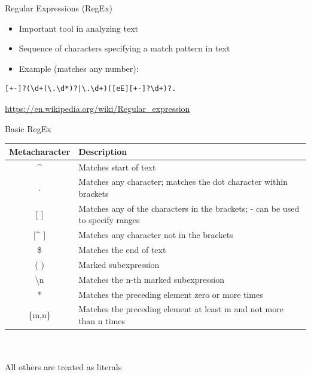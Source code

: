 \documentclass[ignorenonframetext,xcolor=x11names]{beamer}
\begin{document}
\begin{frame}[label=advanced,fragile]{Regular Expressions (RegEx)}
\begin{itemize}
	\item Important tool in analyzing text
	\item Sequence of characters specifying a match pattern in text
	\item Example (matches any number):
\end{itemize}
\begin{verbatim}
[+-]?(\d+(\.\d*)?|\.\d+)([eE][+-]?\d+)?.
\end{verbatim}
\tiny{\url{https://en.wikipedia.org/wiki/Regular\_expression}}
\end{frame}

\begin{frame}[label=advanced]{Basic RegEx}
\footnotesize
\renewcommand{\arraystretch}{1.5}
\begin{tabularx}{\textwidth}{c|X} \hline
{\bf Metacharacter} & {\bf Description} \\ \hline \hline
\^{ } & Matches start of text \\ \hline
. & Matches any character; matches the dot character within brackets \\ \hline
$[$ $]$ & Matches any of the characters in the brackets; - can be used to specify ranges \\ \hline
$[$\^{ } $]$ & Matches any character not in the brackets \\ \hline
\$ & Matches the end of text \\ \hline
( ) & Marked subexpression \\ \hline
\textbackslash n & Matches the n-th marked subexpression \\ \hline
* & Matches the preceding element zero or more times \\ \hline
\{m,n\} & Matches the preceding element at least m and not more than n times \\ \hline
\end{tabularx} \\ \\

All others are treated as literals
\end{frame}
\end{document}

